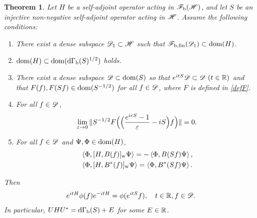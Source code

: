 \documentclass[12pt]{article}
\theoremstyle{plain}
\newtheorem{theorem}{Theorem}[section]
\numberwithin{equation}{section}
\theoremstyle{remark}
\begin{document}
\begin{theorem}\label{diag prop}
Let $H$ be a self-adjoint operator acting in $\mathscr{F}_\mathrm{b}(\mathscr{H})$, and let $S$ be an injective non-negative self-adjoint
operator acting in $\mathscr{H}$. 
Assume the following conditions:
\begin{enumerate}
\item[(i)] There exist a dense subspace $\mathscr{D}_1\subset \mathscr{H}$ such that $\mathscr{F}_\mathrm{b,fin}(\mathscr{D}_1)\subset \mathop{\mathrm{dom}}(H)$.
\item[(ii)] $\mathop{\mathrm{dom}}(H) \subset \mathop{\mathrm{dom}}(\mathrm{d\Gamma_b}(S)^{1/2})$ holds.
\item[(iii)] There exist a dense subspace $\mathscr{D}\subset \mathop{\mathrm{dom}}(S)$ so that 
$e^{itS}\mathscr{D} \subset \mathscr{D}\ (t\in\mathbb{R})$ and that $F(f),F(Sf)\in\mathop{\mathrm{dom}}(S^{-1/2})$ for all $f\in \mathscr{D}$, where $F$ is defined in \eqref{defF}.
\item[(iv)] For all $f\in\mathscr{D}$, 
  \begin{align*}
   \lim_{\varepsilon\to 0}\| S^{-1/2}F\Big(\Big(\frac{e^{i\varepsilon S}-1}{\varepsilon} -iS\Big)f\Big) \| =0.    
  \end{align*}
\item[(v)] For all $f\in\mathscr{D}$ and $ \Psi,\Phi\in\mathop{\mathrm{dom}}(H)$,
\begin{align}
& \left\langle\Phi,[H,B(f)]_\mathrm{w}\Psi\right\rangle = -\left\langle\Phi,B(Sf)\Psi\right\rangle,   \label{comm1}\\ 
& \left\langle\Phi,[H,B^*(f)]_\mathrm{w}\Psi\right\rangle = \left\langle\Phi,B^*(Sf)\Psi\right\rangle. \label{comm2}
\end{align}
\end{enumerate}
Then
\begin{align}
  e^{itH} \phi(f) e^{-itH} = \phi(e^{itS}f), \quad 
  t\in\mathbb{R}, f\in\mathscr{D}. \label{transH}
\end{align}
In particular, $UHU^* = \mathrm{d\Gamma_b}(S)+E$ for some $E\in\mathbb{R}$.
\end{theorem}
\end{document}
